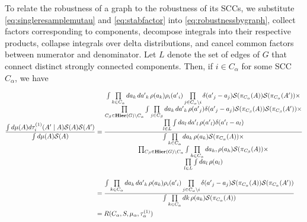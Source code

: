 To relate the robustness of a graph to the robustness of its SCCs, we substitute \ref{eq:singleresamplemutau} and \ref{eq:stabfactor} into \ref{eq:robustnessbygraph}, collect factors corresponding to components, decompose integrals into their respective products, collapse integrals over delta distributions, and cancel common factors between numerator and denominator.  Let $L$ denote the set of edges of $G$ that connect distinct strongly connected components.  Then, if $i \in C_\alpha$ for some SCC $C_\alpha$, we have
\begin{widetext}
\begin{equation}\label{eq:robustncessforsccs}
\begin{aligned}
\frac{\int d\mu(A) d\tau^{(1)}_i (A' \mid A) \mathcal{S}(A) \mathcal{S}(A')}
       {\int d\mu(A) \mathcal{S}(A)}
&= \frac{\begin{matrix}
  \int \prod\limits_{k \in C_\alpha} da_k\,d{a'}_k\, \rho(a_k)
    \rho_i({a'}_i) \prod\limits_{j \in C_\alpha \setminus i} \delta ({a'}_j - a_j)
    \mathcal{S}(\pi_{C_{\alpha}}(A)) \mathcal{S}(\pi_{C_{\alpha}}(A')) \times \\
 \prod\limits_{C_\beta \in \mathbf{Hier}(G) \setminus C_\alpha} \int
   \prod\limits_{j \in C_\beta} da_k\,d{a'}_k\, \rho({a'}_j) \delta ({a'}_j - a_j)
      \mathcal{S}(\pi_{C_{\beta}}(A)) \mathcal{S}(\pi_{C_{\beta}}(A')) \times \\
 \prod\limits_{l \in L} \int da_l\,d{a'}_l\,\rho({a'}_l) \delta({a'}_l - a_l) \end{matrix}}
{\begin{matrix}\int \prod\limits_{k \in C_\alpha} da_k\,\rho(a_k) \mathcal{S}(\pi_{C_{\alpha}}(A)) \times \\
 \prod_{C_\beta \in \mathbf{Hier}(G) \setminus C_\alpha}
   \int \prod\limits_{h \in C_\alpha} da_h,\rho(a_h) \mathcal{S}(\pi_{C_{\beta}}(A)) \times \\
 \prod\limits_{l \in L} \int da_l\,\rho(a_l) \end{matrix}} \\[1em]
&= \frac{\int \prod\limits_{k \in C_\alpha} da_k\,d{a'}_k\,\rho(a_k)
    \rho_i({a'}_i) \prod\limits_{j \in C_\alpha \setminus i} \delta ({a'}_j - a_j)
    \mathcal{S}(\pi_{C_{\alpha}}(A)) \mathcal{S}(\pi_{C_{\alpha}}(A'))}
{\int \prod\limits_{k \in C_\alpha} dk\, \rho(a_k) \mathcal{S}(\pi_{C_{\alpha}}(A))} \\
&= R(C_{\alpha}, S, \mu_\alpha, \tau^{(1)}_\alpha)
\end{aligned}
\end{equation}
\end{widetext}
